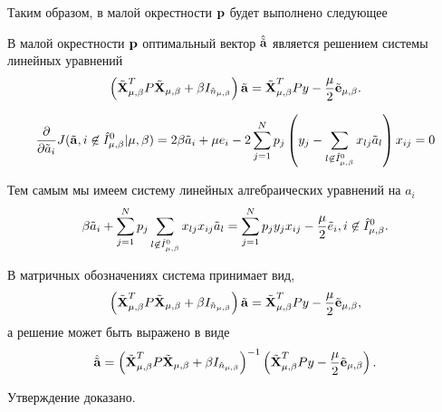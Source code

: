 Таким образом, в малой окрестности $\boldsymbol{\mathbf{p}}$ будет выполнено следующее

\begin{statement}
\label{stmnt:locally_linear}
В малой окрестности $\boldsymbol{\mathbf{p}}$ оптимальный вектор $\hat{\tilde{\mathbf a}}$ является решением системы линейных уравнений
\begin{equation*}
	\left(\tilde{\boldsymbol{\mathbf{X}}}^T_{\mu,\beta} P\tilde{\boldsymbol{\mathbf{X}}}_{\mu,\beta} + \beta I_{\hat n_{\mu,\beta}}\right) \tilde{\boldsymbol{\mathbf{a}}}
		= \tilde{\boldsymbol{\mathbf{X}}}^T_{\mu,\beta} P y -\frac\mu2\tilde{\boldsymbol{\mathbf{e}}}_{\mu,\beta}.
\end{equation*}
\end{statement}

\begin{Proof}
\begin{equation}
	\frac{\partial}{\partial\tilde a_i}J(\tilde{\boldsymbol{\mathbf{a}}}, i\not\in \hat I^0_{\mu,\beta} | {\mu,\beta})
		= 2\beta \tilde a_i + \mu e_i - 2\sum\limits_{j=1}^N p_j\left(y_j - \sum\limits_{l\not\in \hat I^0_{\mu,\beta}}x_{lj}\tilde a_l\right)x_{ij} = 0
\end{equation}

Тем самым мы имеем систему линейных алгебраических уравнений на $a_i$
\begin{equation*}
	\beta \tilde a_i + \sum\limits_{j=1}^N p_j\sum\limits_{l\not\in \hat I^0_{\mu,\beta}} x_{lj}x_{ij}\tilde a_l
		= \sum\limits_{j=1}^N p_jy_jx_{ij} -\frac\mu2 \tilde e_i, i\not\in \hat I^0_{\mu,\beta}.
\end{equation*}

В матричных обозначениях система принимает вид,
\begin{equation*}
	\left(\tilde{\boldsymbol{\mathbf{X}}}^T_{\mu,\beta} P\tilde{\boldsymbol{\mathbf{X}}}_{\mu,\beta} + \beta I_{\hat n_{\mu,\beta}}\right) \tilde{\boldsymbol{\mathbf{a}}}
		= \tilde{\boldsymbol{\mathbf{X}}}^T_{\mu,\beta} P y -\frac\mu2\tilde{\boldsymbol{\mathbf{e}}}_{\mu,\beta},
\end{equation*}
а решение может быть выражено в виде
\begin{equation}
	\hat{\tilde{\mathbf a}}
		= \left(\tilde{\boldsymbol{\mathbf{X}}}^T_{\mu,\beta} P\tilde{\boldsymbol{\mathbf{X}}}_{\mu,\beta} + \beta I_{\hat n_{\mu,\beta}}\right)^{-1}\left(\tilde{\boldsymbol{\mathbf{X}}}^T_{\mu,\beta} P y -\frac\mu2\tilde{\boldsymbol{\mathbf{e}}}_{\mu,\beta}\right).
\end{equation}

Утверждение доказано.
\end{Proof}


